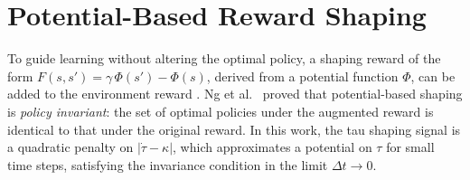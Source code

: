 \section{Potential-Based Reward Shaping}
\label{sec:shaping}

To guide learning without altering the optimal policy, a shaping reward of the form
$F(s, s') = \gamma\,\Phi(s') - \Phi(s)$, derived from a potential function $\Phi$,
can be added to the environment reward \cite{ng1999}.
Ng et al.\ \cite{ng1999} proved that potential-based shaping is \emph{policy invariant}:
the set of optimal policies under the augmented reward is identical to that under the
original reward.
In this work, the tau shaping signal is a quadratic penalty on $|\dot{\tau} - \kappa|$,
which approximates a potential on $\tau$ for small time steps, satisfying the invariance
condition in the limit $\Delta t \to 0$.

